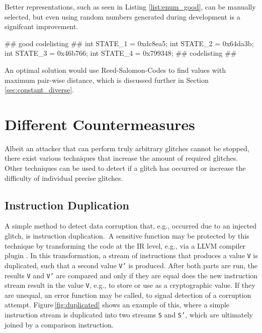 Better representations, such as seen in Listing \ref{list:enum_good}, can be manually selected, but even using random numbers generated during development is a signifcant improvement.

## good codelisting ##
int STATE_1 = 0xdc8ea5;
int STATE_2 = 0x64da3b;
int STATE_3 = 0x46b766;
int STATE_4 = 0x799348;
\label{list:enum_good}
## codelisting ##

An optimal solution would use Reed-Salomon-Codes  to find values with maximum pair-wise distance, which is discussed further in Section\,\ref{sec:constant_diverse}.
\chapter{Different Countermeasures}
\label{chap:counter}
Albeit an attacker that can perform truly arbitrary glitches cannot be stopped, there exist various techniques that increase the amount of required glitches. Other techniques  can be used to detect if a glitch has occurred or increase the difficulty of individual precise glitches.

\section{Instruction Duplication}
A simple method to detect data corruption that, e.g., occurred due to an injected glitch, is instruction duplication.\,\cite{chang2019evaluating} A sensitive function may be protected by this technique by transforming the code at the IR  level, e.g., via a LLVM compiler plugin . In this transformation, a stream of instructions that produces a value \texttt{V} is duplicated, such that a second value \texttt{V'} is produced. After both parts are run, the results \texttt{V} and \texttt{V'} are compared and only if they are equal does the new instruction stream result in the value \texttt{V}, e.g., to store or use as a cryptographic value. If they are unequal, an error function may be called, to signal detection of a corruption attempt. Figure\,\ref{fig:duplicated} shows an example of this, where a simple instruction stream is duplicated into two streams \texttt{S} and \texttt{S'}, which are ultimately joined by a comparison instruction.

